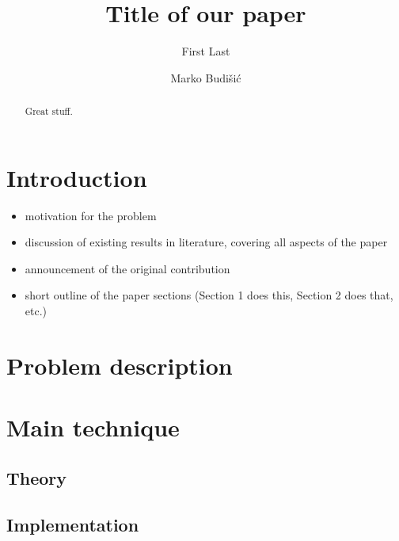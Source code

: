 \documentclass{amsart}
\begin{document}
\title{Title of our paper}

\author{First Last}
\address{Department of Mathematics, Clarkson University,
Potsdam, NY}

\author{Marko Budi\v{s}i\'c}
\address{Department of Mathematics, Clarkson University,
Potsdam, NY}

\begin{abstract}
Great stuff.
\end{abstract}

\maketitle %
\tableofcontents %

\section{Introduction}

\begin{itemize}
\item motivation for the problem
\item discussion of existing results in literature, covering all aspects of the paper
\item announcement of the original contribution
\item short outline of the paper sections (Section 1 does this, Section 2 does that, etc.)
\end{itemize}

\section{Problem description}

\section{Main technique}

\subsection{Theory}

\subsection{Implementation}
\end{document}

